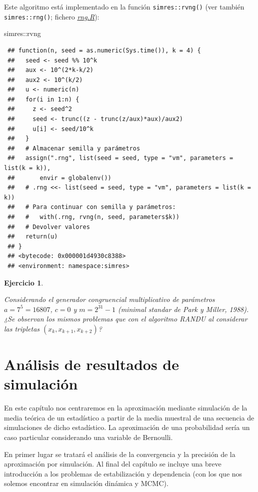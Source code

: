 \documentclass[
]{book}
\newenvironment{Shaded}{\begin{snugshade}}{\end{snugshade}}
\newcommand{\NormalTok}[1]{#1}
\newcommand{\SpecialCharTok}[1]{\textcolor[rgb]{0.00,0.00,0.00}{#1}}
\theoremstyle{break}
\newtheorem{exercise}{Ejercicio}[chapter]
\theoremstyle{nonumberplain}
\begin{document}
Este algoritmo está implementado en la función \texttt{simres::rvng()} (ver también \texttt{simres::rng()}; fichero \href{R/rng.R}{\emph{rng.R}}):

\begin{Shaded}
\begin{Highlighting}[]
\NormalTok{simres}\SpecialCharTok{::}\NormalTok{rvng}
\end{Highlighting}
\end{Shaded}

\begin{verbatim}
 ## function(n, seed = as.numeric(Sys.time()), k = 4) {
 ##   seed <- seed %% 10^k
 ##   aux <- 10^(2*k-k/2)
 ##   aux2 <- 10^(k/2)
 ##   u <- numeric(n)
 ##   for(i in 1:n) {
 ##     z <- seed^2
 ##     seed <- trunc((z - trunc(z/aux)*aux)/aux2)
 ##     u[i] <- seed/10^k
 ##   }
 ##   # Almacenar semilla y parámetros
 ##   assign(".rng", list(seed = seed, type = "vm", parameters = list(k = k)),
 ##       envir = globalenv())
 ##   # .rng <<- list(seed = seed, type = "vm", parameters = list(k = k))
 ##   # Para continuar con semilla y parámetros:
 ##   #   with(.rng, rvng(n, seed, parameters$k))
 ##   # Devolver valores
 ##   return(u)
 ## }
 ## <bytecode: 0x000001d4930c8388>
 ## <environment: namespace:simres>
\end{verbatim}

\begin{exercise}
\protect\hypertarget{exr:parkmiller}{}\label{exr:parkmiller}

Considerando el generador congruencial multiplicativo de parámetros \(a=7^{5}=16807\), \(c=0\) y \(m=2^{31}-1\) (\emph{minimal standar} de Park y Miller, 1988).
¿Se observan los mismos problemas que con el algoritmo RANDU al considerar las tripletas \((x_{k},x_{k+1},x_{k+2})\)?
\end{exercise}

\hypertarget{resultados}{%
\chapter{Análisis de resultados de simulación}\label{resultados}}

En este capítulo nos centraremos en la aproximación mediante simulación de la media teórica de un estadístico a partir de la media muestral de una secuencia de simulaciones de dicho estadístico.
La aproximación de una probabilidad sería un caso particular considerando una variable de Bernoulli.

En primer lugar se tratará el análisis de la convergencia y la precisión de la aproximación por simulación.
Al final del capítulo se incluye una breve introducción a los problemas de estabilización y dependencia (con los que nos solemos encontrar en simulación dinámica y MCMC).
\end{document}
